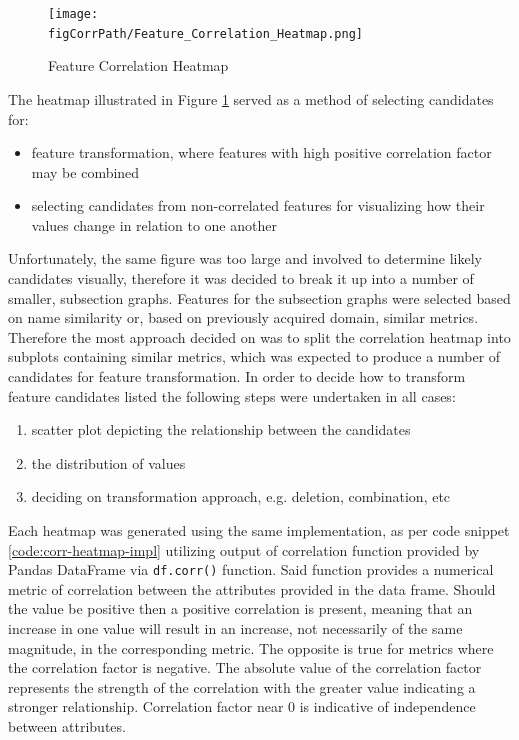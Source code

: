 \begin{figure}
    \texttt{[image: \\figCorrPath/Feature\_Correlation\_Heatmap.png]}
    \caption{Feature Correlation Heatmap}
    \label{fig:correlation-all-features}
\end{figure}


The heatmap illustrated in Figure \ref{fig:correlation-all-features} served as a method of selecting candidates for:
\begin{itemize}
    \item feature transformation, where features with high positive correlation factor may be combined 
    \item selecting candidates from non-correlated features for visualizing how their values change in relation to one another
\end{itemize}

Unfortunately, the same figure was too large and involved to determine likely candidates visually, therefore it was decided to break it up into a number of smaller, subsection graphs. Features for the subsection graphs were selected based on name similarity or, based on previously acquired domain, similar metrics.
Therefore the most approach decided on was to split the correlation heatmap into subplots containing similar metrics, which was expected to produce a number of candidates for feature transformation. In order to decide how to transform feature candidates listed the following steps were undertaken in all cases:
\begin{enumerate}
    \item scatter plot depicting the relationship between the candidates
    \item the distribution of values 
    \item deciding on transformation approach, e.g. deletion, combination, etc
\end{enumerate}
Each heatmap was generated using the same implementation, as per code snippet \ref{code:corr-heatmap-impl} utilizing output of correlation function provided by Pandas DataFrame via \texttt{df.corr()} function. Said function provides a numerical metric of correlation between the attributes provided in the data frame. Should the value be positive then a positive correlation is present, meaning that an increase in one value will result in an increase, not necessarily of the same magnitude, in the corresponding metric. The opposite is true for metrics where the correlation factor is negative. The absolute value of the correlation factor represents the strength of the correlation with the greater value indicating a stronger relationship. Correlation factor near 0 is indicative of independence between attributes.

